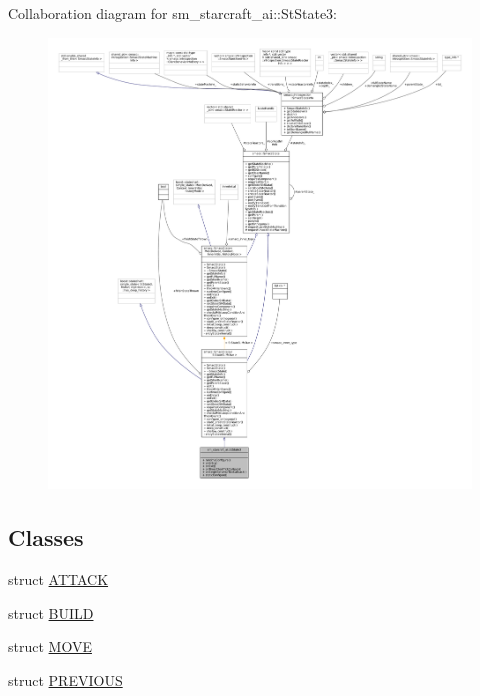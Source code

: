 Collaboration diagram for sm\+\_\+starcraft\+\_\+ai\+:\+:St\+State3\+:
\nopagebreak
\begin{figure}[H]
\begin{center}
\leavevmode
\includegraphics[width=350pt]{structsm__starcraft__ai_1_1StState3__coll__graph}
\end{center}
\end{figure}
\subsection*{Classes}
\begin{DoxyCompactItemize}
\item 
struct \hyperlink{structsm__starcraft__ai_1_1StState3_1_1ATTACK}{A\+T\+T\+A\+CK}
\item 
struct \hyperlink{structsm__starcraft__ai_1_1StState3_1_1BUILD}{B\+U\+I\+LD}
\item 
struct \hyperlink{structsm__starcraft__ai_1_1StState3_1_1MOVE}{M\+O\+VE}
\item 
struct \hyperlink{structsm__starcraft__ai_1_1StState3_1_1PREVIOUS}{P\+R\+E\+V\+I\+O\+US}
\end{DoxyCompactItemize}
